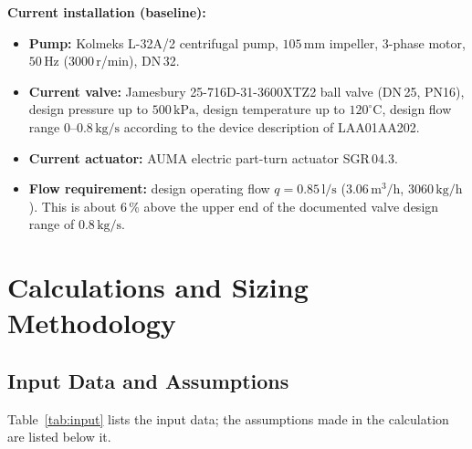 \documentclass[11pt,a4paper]{article}
\begin{document}
\textbf{Current installation (baseline):}
\begin{itemize}
    \item \textbf{Pump:} Kolmeks L-32A/2 centrifugal pump, $105\,\text{mm}$ impeller, 3-phase motor, $50\,\text{Hz}$ (3000\,r/min), DN\,32.
    \item \textbf{Current valve:} Jamesbury 25-716D-31-3600XTZ2 ball valve (DN\,25, PN16), design pressure up to $500\,\text{kPa}$, design temperature up to $120^\circ\text{C}$, design flow range $0$--$0.8\,\text{kg/s}$ according to the device description of LAA01AA202.
    \item \textbf{Current actuator:} AUMA electric part-turn actuator SGR\,04.3.
    \item \textbf{Flow requirement:} design operating flow $q = 0.85\,\text{l/s}$ ($3.06\,\text{m}^3/\text{h}$, $3060\,\text{kg/h}$). This is about 6\,\% above the upper end of the documented valve design range of $0.8\,\text{kg/s}$.
\end{itemize}

\section{Calculations and Sizing Methodology}

\subsection{Input Data and Assumptions}
Table~\ref{tab:input} lists the input data; the assumptions made in the calculation are listed below it.
\end{document}
